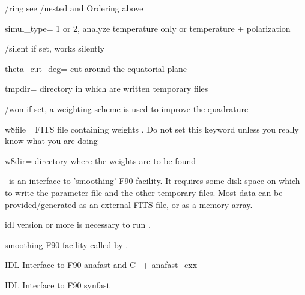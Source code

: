 \begin{keywords}
\begin{kwlist}{}
\item[/ring] see /nested and Ordering above

\item[simul\_type=] 1 or 2, analyze temperature only or temperature + polarization

\item[/silent]    if set, works silently

\item[theta\_cut\_deg=] cut around the equatorial plane 

\item[tmpdir=]      directory in which are written temporary files 

\item[/won]     if set, a weighting scheme is used to improve the quadrature

\item[w8file=]    FITS file containing weights 
     .
   Do not set this keyword unless you really know what you are doing

\item[w8dir=]     directory where the weights are to be found 

  \end{kwlist}
\end{keywords}  

\begin{codedescription}
{\thedocid\ is an interface to 'smoothing' F90 facility. It
requires some disk space on which to write the parameter file and the other
temporary files. Most data can be provided/generated as an external FITS
file, or as a memory array.}
\end{codedescription}



\begin{related}
  \begin{sulist}{} %
    \item[idl] version \idlversion or more is necessary to run \thedocid.
    \item[smoothing] F90 facility called by \thedocid.
    \item[\htmlref{ianafast}{idl:ianafast}] IDL Interface to F90 anafast and C++ anafast\_cxx
    \item[\htmlref{isynfast}{idl:isynfast}] IDL Interface to F90 synfast
  \end{sulist}
\end{related}

